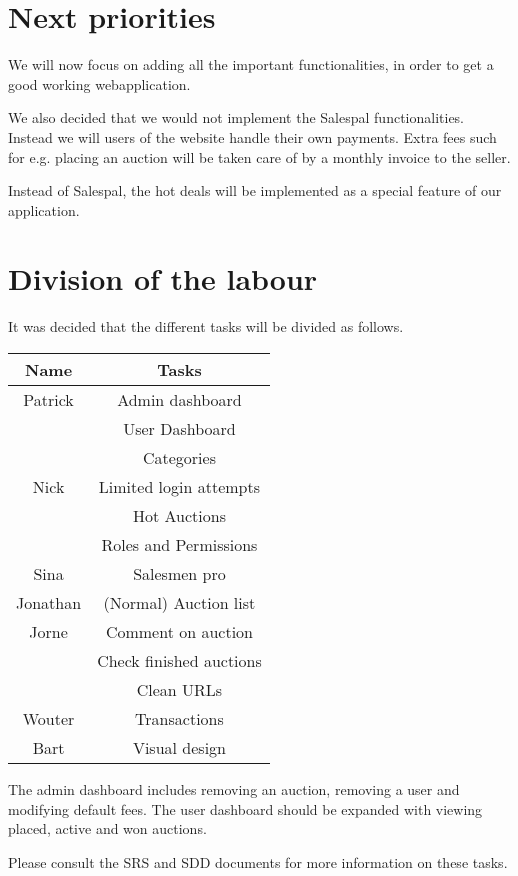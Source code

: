 \documentclass[a4paper, 12pt]{article}
\begin{document}
	\section{Next priorities}
		We will now focus on adding all the important functionalities, in order to get a good working webapplication. 
		
		We also decided that we would not implement the Salespal functionalities. Instead we will users of the website handle their own payments. Extra fees such for e.g. placing an auction will be taken care of by a monthly invoice to the seller.
		
		Instead of Salespal, the hot deals will be implemented as a special feature of our application.
		
	\section{Division of the labour}
		It was decided that the different tasks will be divided as follows.
		
		\begin{tabular}{c|c}
			\textbf{Name} & \textbf{Tasks} \\
			\hline Patrick & Admin dashboard \\ 
						   & User Dashboard \\ 
						   & Categories \\
			\hline Nick & Limited login attempts \\
						& Hot Auctions \\
						& Roles and Permissions \\
			\hline Sina & Salesmen pro \\
			\hline Jonathan & (Normal) Auction list \\
			\hline Jorne & Comment on auction \\
						 & Check finished auctions \\
						 & Clean URLs \\
			\hline Wouter & Transactions \\
			\hline Bart & Visual design \\
		\end{tabular} 
		
		The admin dashboard includes removing an auction, removing a user and modifying default fees. The user dashboard should be expanded with viewing placed, active and won auctions.
		
		Please consult the SRS and SDD documents for more information on these tasks.
		
\end{document}
